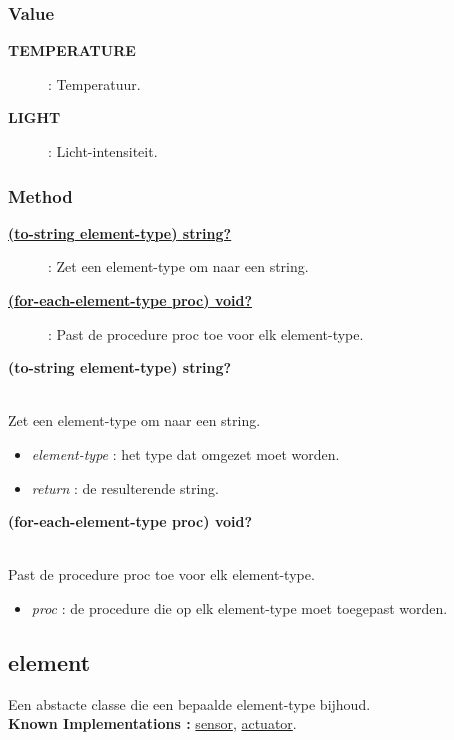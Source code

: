 \documentclass{article}
\newcommand{\ar}{\ding{213} }
\newcommand{\code}[1]{\textcolor{code}{#1}}
\newcommand{\lb}[1][]{\code{(#1}}
\newcommand{\rb}{\code{)}}
\newcommand{\racket}[1]{
	{\color{blue}\textbf{#1}}
}
\begin{document}
\subsubsection{Value}
\begin{description}
\item[\racket{\code{TEMPERATURE}}] : Temperatuur.
\item[\racket{\code{LIGHT}}] : Licht-intensiteit.
\end{description}

\subsubsection{Method}
\begin{description}
\item[\hyperlink{element-type:to-string}{\racket{\lb[to-string] element-type\rb \ar \code{string?}}}] : Zet een element-type om naar een string.
\item[\hyperlink{element-type:for-each-element-type}{\racket{\lb[for-each-element-type] proc\rb \ar \code{void?}}}] : Past de procedure proc toe voor elk element-type.
\end{description}

\begin{framed}
\hypertarget{element-type:to-string}{\racket{\lb[to-string] element-type\rb \ar \code{string?}}}
\\Zet een element-type om naar een string.
\begin{itemize}
	\item \emph{element-type} : het type dat omgezet moet worden.
	\item \emph{return} : de resulterende string.
\end{itemize}
\end{framed}

\begin{framed}
\hypertarget{element-type:for-each-element-type}{\racket{\lb[for-each-element-type] proc\rb \ar \code{void?}}}
\\Past de procedure proc toe voor elk element-type.
\begin{itemize}
	\item \emph{proc} : de procedure die op elk element-type moet toegepast worden.
\end{itemize}
\end{framed}

\newpage
\hypertarget{element}{\subsection{element}}
Een abstacte classe die een bepaalde element-type bijhoud.
\\\textbf{Known Implementations :} \hyperlink{sensor}{sensor}, \hyperlink{actuator}{actuator}.
\end{document}
